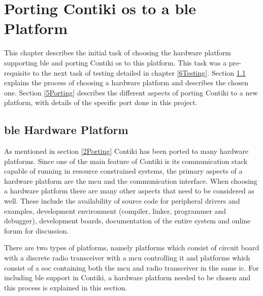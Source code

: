 \chapter{Porting Contiki \texorpdfstring{\gls{os}}{OS} to a \texorpdfstring{\gls{ble}}{BLE} Platform} \label{5bleContiki}

This chapter describes the initial task of choosing the hardware platform supporting \gls{ble} and porting Contiki \gls{os} to this platform. This task was a pre-requisite to the next task of testing detailed in chapter \ref{6Testing}. Section \ref{5HwPlt} explains the process of choosing a hardware platform and describes the chosen one. Section \ref{5Porting} describes the different aspects of porting Contiki to a new platform, with details of the specific port done in this project.

\section{\texorpdfstring{\gls{ble}}{BLE} Hardware Platform} \label{5HwPlt}

As mentioned in section \ref{2Porting} Contiki has been ported to many hardware platforms. Since one of the main feature of Contiki is its communication stack capable of running in resource constrained systems, the primary aspects of a hardware platform are the \gls{mcu} and the communication interface. When choosing a hardware platform there are many other aspects that need to be considered as well. These include the availability of source code for peripheral drivers and examples, development environment (compiler, linker, programmer and debugger), development boards, documentation of the entire system and online forum for discussion.

There are two types of platforms, namely platforms which consist of circuit board with a discrete radio transceiver with a \gls{mcu} controlling it and platforms which consist of a \gls{soc} containing both the \gls{mcu} and radio transceiver in the same \gls{ic}. For including \gls{ble} support in Contiki, a hardware platform needed to be chosen and this process is explained in this section.

